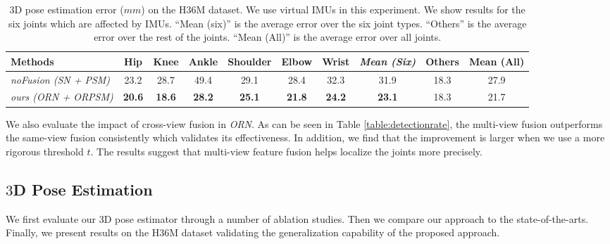 \documentclass[10pt,twocolumn,letterpaper]{article}
\begin{document}
\begin{table*}[!htbp]
\center
\caption{$3$D pose estimation error ($mm$) on the H36M dataset. We use virtual IMUs in this experiment.
We show results for the six joints which are affected by IMUs. ``Mean (six)'' is the average error over the six joint types. ``Others'' is the average error over the rest of the joints. ``Mean (All)'' is the average error over all joints.}
\label{table:h36m_mpjpe}
\begin{tabular}{l||ccccccc||c||c}
\toprule
   Methods & Hip  & Knee & Ankle & Shoulder & Elbow & Wrist & \emph{Mean (Six)} & Others & Mean (All)\\ \hline
\emph{noFusion (SN + PSM)} & 23.2	&28.7&	49.4&	29.1&	28.4&	32.3&	31.9&	18.3 & 27.9 \\
\emph{ours (ORN + ORPSM)} & \textbf{20.6}	& \textbf{18.6} &	\textbf{28.2} &	\textbf{25.1} &	\textbf{21.8} &	\textbf{24.2} &	\textbf{23.1} &	18.3 & {21.7} \\
\toprule
\end{tabular}
\end{table*}

We also evaluate the impact of cross-view fusion in \emph{ORN}. As can be seen in Table \ref{table:detectionrate}, the multi-view fusion outperforms the same-view fusion consistently which validates its effectiveness. In addition, we find that the improvement is larger when we use a more rigorous threshold $t$. The results suggest that multi-view feature fusion helps localize the joints more precisely.

\subsection{$3$D Pose Estimation}
We first evaluate our $3$D pose estimator through a number of ablation studies. Then we compare our approach to the state-of-the-arts. Finally, we present results on the H36M dataset validating the generalization capability of the proposed approach.
\end{document}
